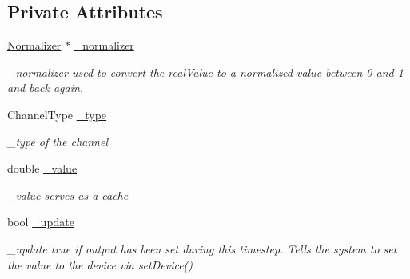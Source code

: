 \subsection*{Private Attributes}
\begin{DoxyCompactItemize}
\item 
\hypertarget{classdrobot_1_1device_1_1channel_1_1Channel_a1f141dd820e286c226aa91069527b8f7}{\hyperlink{classdrobot_1_1device_1_1channel_1_1Normalizer}{Normalizer} $\ast$ \hyperlink{classdrobot_1_1device_1_1channel_1_1Channel_a1f141dd820e286c226aa91069527b8f7}{\-\_\-normalizer}}\label{classdrobot_1_1device_1_1channel_1_1Channel_a1f141dd820e286c226aa91069527b8f7}

\begin{DoxyCompactList}\small\item\em \-\_\-normalizer used to convert the real\-Value to a normalized value between 0 and 1 and back again. \end{DoxyCompactList}\item 
\hypertarget{classdrobot_1_1device_1_1channel_1_1Channel_a5833ff457f5a59ad06f6e201056c6f1d}{Channel\-Type \hyperlink{classdrobot_1_1device_1_1channel_1_1Channel_a5833ff457f5a59ad06f6e201056c6f1d}{\-\_\-type}}\label{classdrobot_1_1device_1_1channel_1_1Channel_a5833ff457f5a59ad06f6e201056c6f1d}

\begin{DoxyCompactList}\small\item\em \-\_\-type of the channel \end{DoxyCompactList}\item 
\hypertarget{classdrobot_1_1device_1_1channel_1_1Channel_a636ff496310f897ba9b877285152f859}{double \hyperlink{classdrobot_1_1device_1_1channel_1_1Channel_a636ff496310f897ba9b877285152f859}{\-\_\-value}}\label{classdrobot_1_1device_1_1channel_1_1Channel_a636ff496310f897ba9b877285152f859}

\begin{DoxyCompactList}\small\item\em \-\_\-value serves as a cache \end{DoxyCompactList}\item 
\hypertarget{classdrobot_1_1device_1_1channel_1_1Channel_ab34987fd04666bc36f0962b23de48faa}{bool \hyperlink{classdrobot_1_1device_1_1channel_1_1Channel_ab34987fd04666bc36f0962b23de48faa}{\-\_\-update}}\label{classdrobot_1_1device_1_1channel_1_1Channel_ab34987fd04666bc36f0962b23de48faa}

\begin{DoxyCompactList}\small\item\em \-\_\-update true if output has been set during this timestep. Tells the system to set the value to the device via set\-Device() \end{DoxyCompactList}\end{DoxyCompactItemize}


